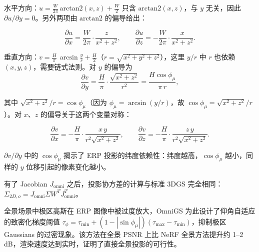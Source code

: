 水平方向：$u = \frac{W}{2\pi}\,\text{arctan2}(x, z) + \frac{W}{2}$ 只含 $\text{arctan2}(x, z)$，与 $y$ 无关，因此 $\partial u/\partial y = 0$。另外两项由 $\text{arctan2}$ 的偏导给出：

\begin{equation*}
    \frac{\partial u}{\partial x} = \frac{W}{2\pi}\cdot\frac{z}{x^2 + z^2}, \qquad
    \frac{\partial u}{\partial z} = -\frac{W}{2\pi}\cdot\frac{x}{x^2 + z^2}.
\end{equation*}

垂直方向：$v = \frac{H}{\pi}\,\arcsin\frac{y}{r} + \frac{H}{2}$（$r = \sqrt{x^2+y^2+z^2}$），这里 $y/r$ 中 $r$ 也依赖 $(x, y, z)$，需要链式法则。对 $y$ 的偏导为
\begin{equation*}
    \frac{\partial v}{\partial y} = \frac{H}{\pi}\cdot\frac{\sqrt{x^2 + z^2}}{r^2} = \frac{H\cos\phi_\mu}{\pi\, r},
\end{equation*}

其中 $\sqrt{x^2+z^2}/r = \cos\phi_\mu$（因为 $\phi_\mu = \arcsin(y/r)$，故 $\cos\phi_\mu = \sqrt{x^2+z^2}/r$）。对 $x$、$z$ 的偏导关于这两个变量对称：

\begin{equation*}
    \frac{\partial v}{\partial x} = -\frac{H}{\pi}\cdot\frac{x\, y}{r^2\sqrt{x^2+z^2}}, \qquad
    \frac{\partial v}{\partial z} = -\frac{H}{\pi}\cdot\frac{z\, y}{r^2\sqrt{x^2+z^2}}.
\end{equation*}

%
$\partial v/\partial y$ 中的 $\cos\phi_\mu$ 揭示了 ERP 投影的纬度依赖性：纬度越高，$\cos\phi_\mu$ 越小，同样的 $y$ 位移引起的像素变化越小。

有了 Jacobian $J_{\text{omni}}$ 之后，投影协方差的计算与标准 3DGS 完全相同：$\Sigma_{2D,o} = J_{\text{omni}} \Sigma W^T J_{\text{omni}}^T$。

全景场景中极区高斯在 ERP 图像中被过度放大，OmniGS 为此设计了仰角自适应的致密化梯度阈值 $\tau_\phi = \tau_{\min} + (1-|\sin\phi_\mu|)(\tau_{\max} - \tau_{\min})$，抑制极区 Gaussians 的过密现象。该方法在全景 PSNR 上比 NeRF 全景方法提升约 1--2 dB，渲染速度达到实时，证明了直接全景投影的可行性。


